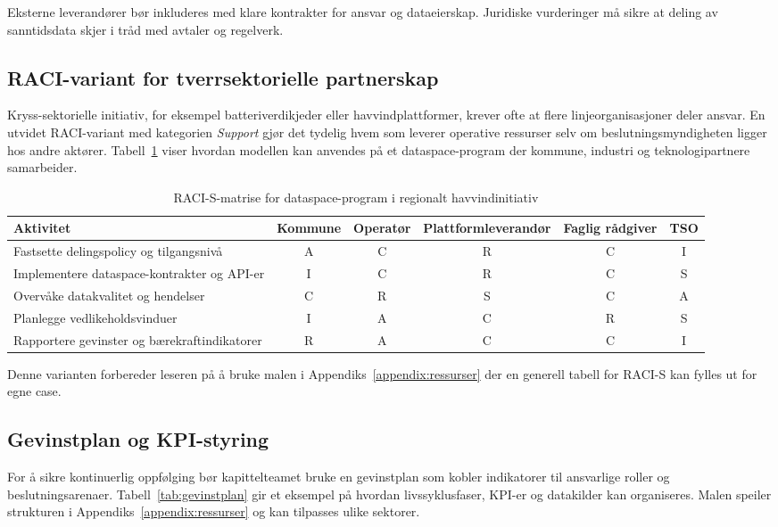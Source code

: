 Eksterne leverandører bør inkluderes med klare kontrakter for ansvar og dataeierskap. Juridiske vurderinger må sikre at deling av sanntidsdata skjer i tråd med avtaler og regelverk.

\subsection*{RACI-variant for tverrsektorielle partnerskap}
Kryss-sektorielle initiativ, for eksempel batteriverdikjeder eller havvindplattformer, krever ofte at flere linjeorganisasjoner deler ansvar. En utvidet RACI-variant med kategorien \emph{Support} gjør det tydelig hvem som leverer operative ressurser selv om beslutningsmyndigheten ligger hos andre aktører. Tabell~\ref{tab:raci-variant} viser hvordan modellen kan anvendes på et dataspace-program der kommune, industri og teknologipartnere samarbeider.

\begin{table}[h]
    \centering
    \caption{RACI-S-matrise for dataspace-program i regionalt havvindinitiativ}
    \label{tab:raci-variant}
    \begin{tabular}{p{4.3cm}ccccc}
        \toprule
        Aktivitet & Kommune & Operatør & Plattformleverandør & Faglig rådgiver & TSO \\
        \midrule
        Fastsette delingspolicy og tilgangsnivå & A & C & R & C & I \\
        Implementere dataspace-kontrakter og API-er & I & C & R & C & S \\
        Overvåke datakvalitet og hendelser & C & R & S & C & A \\
        Planlegge vedlikeholdsvinduer & I & A & C & R & S \\
        Rapportere gevinster og bærekraftindikatorer & R & A & C & C & I \\
        \bottomrule
    \end{tabular}
\end{table}

Denne varianten forbereder leseren på å bruke malen i Appendiks~\ref{appendix:ressurser} der en generell tabell for RACI-S kan fylles ut for egne case.

\subsection*{Gevinstplan og KPI-styring}
For å sikre kontinuerlig oppfølging bør kapittelteamet bruke en gevinstplan som kobler indikatorer til ansvarlige roller og beslutningsarenaer. Tabell~\ref{tab:gevinstplan} gir et eksempel på hvordan livssyklusfaser, KPI-er og datakilder kan organiseres. Malen speiler strukturen i Appendiks~\ref{appendix:ressurser} og kan tilpasses ulike sektorer.

